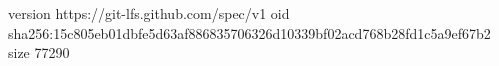 version https://git-lfs.github.com/spec/v1
oid sha256:15c805eb01dbfe5d63af886835706326d10339bf02acd768b28fd1c5a9ef67b2
size 77290
